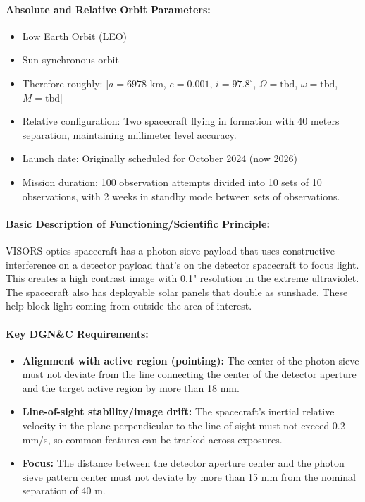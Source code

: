 \paragraph{Absolute and Relative Orbit Parameters:}
\begin{itemize}
    \item Low Earth Orbit (LEO)
    \item Sun-synchronous orbit
    \item Therefore roughly: [$a = 6978$ km, $e = 0.001$, $i = 97.8^{\circ}$, $\Omega = \text{tbd}$, $\omega = \text{tbd}$, $M = \text{tbd}$]
    \item Relative configuration: Two spacecraft flying in formation with 40 meters separation, maintaining millimeter level accuracy.
    \item Launch date: Originally scheduled for October 2024 (now 2026)
    \item Mission duration: 100 observation attempts divided into 10 sets of 10 observations, with 2 weeks in standby mode between sets of observations.
\end{itemize}

\paragraph{Basic Description of Functioning/Scientific Principle:}
VISORS optics spacecraft has a photon sieve payload that uses constructive interference on a detector payload that's on the detector spacecraft to focus light. This creates a high contrast image with 0.1" resolution in the extreme ultraviolet. The spacecraft also has deployable solar panels that double as sunshade. These help block light coming from outside the area of interest.

\paragraph{Key DGN\&C Requirements:}
\begin{itemize}
    \item \textbf{Alignment with active region (pointing):} The center of the photon sieve must not deviate from the line connecting the center of the detector aperture and the target active region by more than 18 mm.
    \item \textbf{Line-of-sight stability/image drift:} The spacecraft's inertial relative velocity in the plane perpendicular to the line of sight must not exceed 0.2 mm/s, so common features can be tracked across exposures.
    \item \textbf{Focus:} The distance between the detector aperture center and the photon sieve pattern center must not deviate by more than 15 mm from the nominal separation of 40 m.
\end{itemize}

